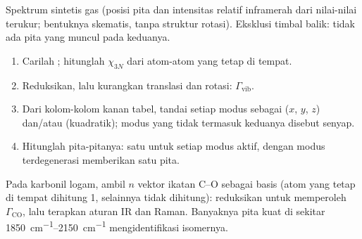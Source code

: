 \begin{omfigure}

{\small Spektrum sintetis gas  (posisi pita dan intensitas relatif
inframerah dari nilai-nilai terukur; bentuknya skematis, tanpa struktur
rotasi). Eksklusi timbal balik: tidak ada pita yang muncul pada keduanya.}
\end{omfigure}

\begin{method}\label{met:b3:group-theory-applied:vibrations}
\begin{enumerate}
  \item Carilah ; hitunglah $\chi_{3N}$ dari atom-atom yang
        tetap di tempat.
  \item Reduksikan, lalu kurangkan translasi dan rotasi: $\Gamma_{\mathrm{vib}}$.
  \item Dari kolom-kolom kanan tabel, tandai setiap modus sebagai 
        ($x$, $y$, $z$) dan/atau  (kuadratik); modus yang tidak
        termasuk keduanya disebut senyap.
  \item Hitunglah pita-pitanya: satu untuk setiap modus aktif, dengan modus
        terdegenerasi memberikan satu pita.
\end{enumerate}
\end{method}

\begin{method}\label{met:b3:group-theory-applied:co-count}
Pada karbonil logam, ambil $n$ vektor ikatan C--O sebagai basis (atom yang
tetap di tempat dihitung 1, selainnya tidak dihitung): reduksikan untuk
memperoleh $\Gamma_{\mathrm{CO}}$, lalu terapkan aturan IR dan Raman. Banyaknya
pita kuat di sekitar \qtyrange{1850}{2150}{cm^{-1}} mengidentifikasi isomernya.
\end{method}

